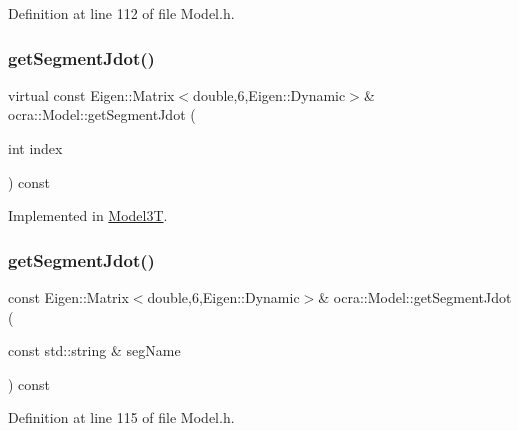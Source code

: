 Definition at line 112 of file Model.\+h.

\hypertarget{classocra_1_1Model_a00cceda96b47bee05cb6366d070d7961}{}\label{classocra_1_1Model_a00cceda96b47bee05cb6366d070d7961} 
\subsubsection{\texorpdfstring{get\+Segment\+Jdot()}{getSegmentJdot()}\hspace{0.1cm}{\footnotesize\ttfamily [1/2]}}
{\footnotesize\ttfamily virtual const Eigen\+::\+Matrix$<$double,6,Eigen\+::\+Dynamic$>$\& ocra\+::\+Model\+::get\+Segment\+Jdot (\begin{DoxyParamCaption}\item[{int}]{index }\end{DoxyParamCaption}) const\hspace{0.3cm}{\ttfamily [pure virtual]}}



Implemented in \hyperlink{classModel3T_a24e4def66a047175935bf343f38a8b84}{Model3T}.

\hypertarget{classocra_1_1Model_ad10d92280b1f57a55be28e50058d131b}{}\label{classocra_1_1Model_ad10d92280b1f57a55be28e50058d131b} 
\subsubsection{\texorpdfstring{get\+Segment\+Jdot()}{getSegmentJdot()}\hspace{0.1cm}{\footnotesize\ttfamily [2/2]}}
{\footnotesize\ttfamily const Eigen\+::\+Matrix$<$double,6,Eigen\+::\+Dynamic$>$\& ocra\+::\+Model\+::get\+Segment\+Jdot (\begin{DoxyParamCaption}\item[{const std\+::string \&}]{seg\+Name }\end{DoxyParamCaption}) const\hspace{0.3cm}{\ttfamily [inline]}}



Definition at line 115 of file Model.\+h.

\hypertarget{classocra_1_1Model_a6fe0178b1e8213e39366b2355d0d4de3}{}\label{classocra_1_1Model_a6fe0178b1e8213e39366b2355d0d4de3} 
